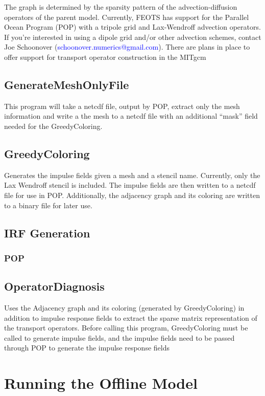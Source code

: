 \documentclass{softwaremanual}
\begin{document}
The graph is determined by the sparsity pattern of the advection-diffusion operators of the parent model. Currently, FEOTS has support for the Parallel Ocean Program (POP) with a tripole grid and Lax-Wendroff advection operators. If you're interested in using a  dipole grid and/or other advection schemes, contact Joe Schoonover (\textcolor{blue}{schoonover.numerics@gmail.com}). There are plans in place to offer support for transport operator construction in the MITgcm
\subsection{GenerateMeshOnlyFile}
This program will take a netcdf file, output by POP, extract only the mesh information and write a the mesh to a netcdf file with an additional ``mask'' field needed for the GreedyColoring.

\subsection{GreedyColoring}
Generates the impulse fields given a mesh and a stencil name. Currently, only the Lax Wendroff stencil is included. The impulse fields are then written to a netcdf file for use in POP. Additionally, the adjacency graph and its coloring are written to a binary file for later use.

\subsection{IRF Generation}
\subsubsection{ POP }

\subsection{OperatorDiagnosis}
Uses the Adjacency graph and its coloring (generated by GreedyColoring) in addition to impulse response fields to extract the sparse matrix representation of the transport operators. Before calling this program, GreedyColoring must be called to generate impulse fields, and the impulse fields need to be passed through POP to generate the impulse response fields 



\section{Running the Offline Model}
\end{document}
